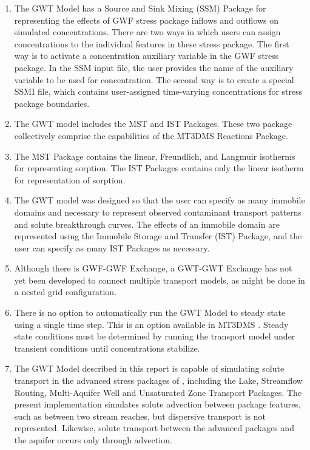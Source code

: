 \begin{enumerate}
\item The GWT Model has a Source and Sink Mixing (SSM) Package for representing the effects of GWF stress package inflows and outflows on simulated concentrations.  There are two ways in which users can assign concentrations to the individual features in these stress package.  The first way is to activate a concentration auxiliary variable in the GWF stress package.  In the SSM input file, the user provides the name of the auxiliary variable to be used for concentration.  The second way is to create a special SSMI file, which contains user-assigned time-varying concentrations for stress package boundaries.

\item The GWT model includes the MST and IST Packages.  These two package collectively comprise the capabilities of the MT3DMS Reactions Package.

\item The MST Package contains the linear, Freundlich, and Langmuir isotherms for representing sorption.  The IST Packages contains only the linear isotherm for representation of sorption. 

\item The GWT model was designed so that the user can specify as many immobile domains and necessary to represent observed contaminant transport patterns and solute breakthrough curves.  The effects of an immobile domain are represented using the Immobile Storage and Transfer (IST) Package, and the user can specify as many IST Packages as necessary.  

\item Although there is GWF-GWF Exchange, a GWT-GWT Exchange has not yet been developed to connect multiple transport models, as might be done in a nested grid configuration.  

\item There is no option to automatically run the GWT Model to steady state using a single time step.  This is an option available in MT3DMS \citep{zheng2010supplemental}.  Steady state conditions must be determined by running the transport model under transient conditions until concentrations stabilize.

\item The GWT Model described in this report is capable of simulating solute transport in the advanced stress packages of \mf, including the Lake, Streamflow Routing, Multi-Aquifer Well and Unsaturated Zone Transport Packages.  The present implementation simulates solute advection between package features, such as between two stream reaches, but dispersive transport is not represented.  Likewise, solute transport between the advanced packages and the aquifer occurs only through advection.


\end{enumerate}
